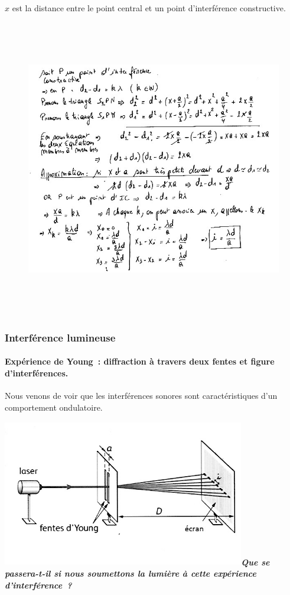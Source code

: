 $x$ est la distance entre le point central et un point d'interférence
constructive.

\begin{figure}
\centering
\includegraphics[width=17.253cm,height=13.09cm]{Pictures/100000010000025F000001F704069EFE234008BD.png}
\caption{}
\end{figure}

\subsubsection{Interférence lumineuse }

\paragraph{Expérience de Young~: diffraction à travers deux fentes
et figure d'interférences. }

Nous venons de voir que les interférences sonores sont caractéristiques
d'un comportement ondulatoire.

\includegraphics[width=10.592cm,height=6.443cm]{Pictures/100000010000025A000001696E99605075C8F3D0.png}\emph{\textbf{Que
se passera-t-il si nous soumettons la lumière à cette expérience
d'interférence~? }}

